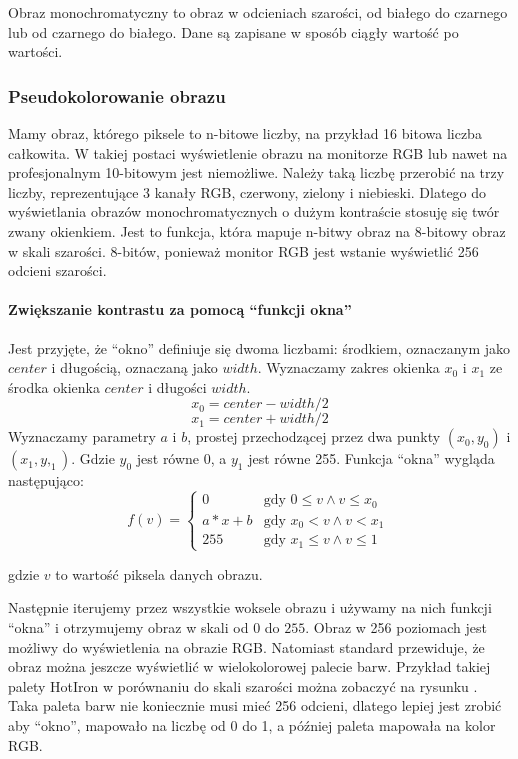 \label{sec:algorithm-pixmap-monochrome}

Obraz monochromatyczny to obraz w odcieniach szarości, od białego do czarnego lub od czarnego do białego. Dane są zapisane w sposób ciągły wartość po wartości.

\subsubsection{Pseudokolorowanie obrazu}

Mamy obraz, którego piksele to n-bitowe liczby, na przykład 16 bitowa liczba całkowita.
W takiej postaci wyświetlenie obrazu na monitorze RGB lub nawet na profesjonalnym 10-bitowym jest niemożliwe.
Należy taką liczbę przerobić na trzy liczby, reprezentujące 3 kanały RGB, czerwony, zielony i niebieski.
Dlatego do wyświetlania obrazów monochromatycznych o dużym kontraście stosuję się twór zwany okienkiem.
Jest to funkcja, która mapuje n-bitwy obraz na 8-bitowy obraz w skali szarości.
8-bitów, ponieważ monitor RGB jest wstanie wyświetlić 256 odcieni szarości.

\paragraph*{Zwiększanie kontrastu za pomocą \enquote{funkcji okna}}
Jest przyjęte, że \enquote{okno} definiuje się dwoma liczbami: środkiem, oznaczanym jako $center$ i długością, oznaczaną jako $width$.
Wyznaczamy zakres okienka $x_0$ i $x_1$ ze środka okienka $center$ i długości $width$.
\[x_0 = center - width / 2\]
\[x_1 = center + width / 2\]
Wyznaczamy parametry $a$ i $b$, prostej przechodzącej przez dwa punkty $(x_0, y_0)$ i $(x_1, y,_1)$.
Gdzie $y_0$ jest równe 0, a $y_1$ jest równe 255.
Funkcja \enquote{okna} wygląda następująco:
\[
    f(v)=
    \begin{cases}
        0     & \text{gdy $0 \le v \wedge v \le x_0$ } \\
        a*x+b & \text{gdy $x_0 < v \wedge v < x_1$}    \\
        255   & \text{gdy $x_1 \le v \wedge v \le 1$ }
    \end{cases}
\]

gdzie $v$ to wartość piksela danych obrazu.

Następnie iterujemy przez wszystkie woksele obrazu i używamy na nich funkcji \enquote{okna} i otrzymujemy obraz w skali od $0$ do $255$.
Obraz w 256 poziomach jest możliwy do wyświetlenia na obrazie RGB.
Natomiast standard \DICOM przewiduje, że obraz można jeszcze wyświetlić w wielokolorowej palecie barw.
Przykład takiej palety HotIron w porównaniu do skali szarości można zobaczyć na rysunku .
Taka paleta barw nie koniecznie musi mieć 256 odcieni, dlatego lepiej jest zrobić aby \enquote{okno}, mapowało na liczbę od 0 do 1, a później paleta mapowała na kolor RGB.



